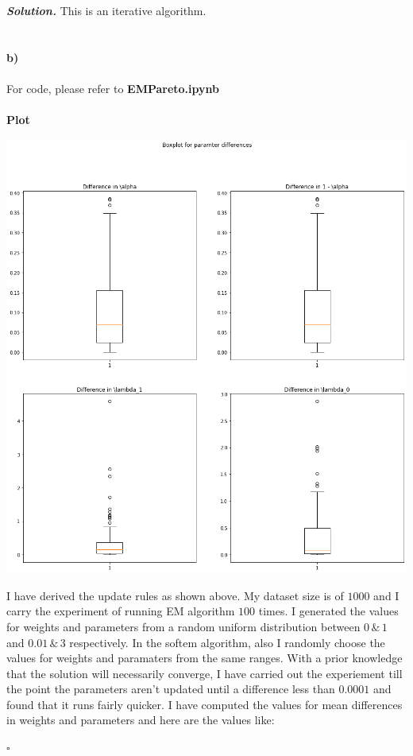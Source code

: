\documentclass[12pt]{article}
\newenvironment{solution}[1][\it{Solution}]{\textbf{#1. } }{$\square$}
\begin{document}
\begin{solution}
This is an iterative algorithm.\\\\\\
\textbf{b)}\\\\
For code, please refer to \textbf{EMPareto.ipynb}\\\\
\textbf{Plot}\\
\begin{center}
\includegraphics[width=18cm, keepaspectratio]{EMPareto}
\end{center}

I have derived the update rules as shown above. My dataset size is of $1000$ and I carry the experiment of running EM algorithm $100$ times. I generated the values for weights and parameters from a random uniform distribution between $0 \,\&\, 1$ and $0.01 \,\&\, 3$ respectively. In the softem algorithm, also I randomly choose the values for weights and paramaters from the same ranges. With a prior knowledge that the solution will necessarily converge, I have carried out the experiement till the point the parameters aren't updated until a difference less than $0.0001$ and found that it runs fairly quicker. I have computed the values for mean differences in weights and parameters and here are the values like:


\end{solution}
\end{document}

